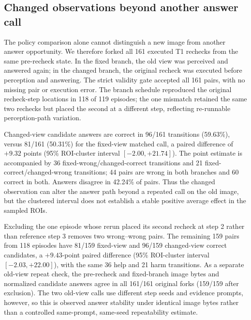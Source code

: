 \subsection{Changed observations beyond another answer call}
The policy comparison alone cannot distinguish a new image from another answer opportunity. We therefore forked all 161 executed T1 rechecks from the same pre-recheck state. In the fixed branch, the old view was perceived and answered again; in the changed branch, the original recheck was executed before perception and answering. The strict validity gate accepted all 161 pairs, with no missing pair or execution error. The branch schedule reproduced the original recheck-step locations in 118 of 119 episodes; the one mismatch retained the same two rechecks but placed the second at a different step, reflecting re-runnable perception-path variation.

Changed-view candidate answers are correct in 96/161 transitions (59.63\%), versus 81/161 (50.31\%) for the fixed-view matched call, a paired difference of $+9.32$ points (95\% ROI-cluster interval $[-2.00,+21.74]$). The point estimate is accompanied by 36 fixed-wrong/changed-correct transitions and 21 fixed-correct/changed-wrong transitions; 44 pairs are wrong in both branches and 60 correct in both. Answers disagree in 42.24\% of pairs. Thus the changed observation can alter the answer path beyond a repeated call on the old image, but the clustered interval does not establish a stable positive average effect in the sampled ROIs.

Excluding the one episode whose rerun placed its second recheck at step 2 rather than reference step 3 removes two wrong--wrong pairs. The remaining 159 pairs from 118 episodes have 81/159 fixed-view and 96/159 changed-view correct candidates, a $+9.43$-point paired difference (95\% ROI-cluster interval $[-2.03,+22.00]$), with the same 36 help and 21 harm transitions. As a separate old-view repeat check, the pre-recheck and fixed-branch image bytes and normalized candidate answers agree in all 161/161 original forks (159/159 after exclusion). The two old-view calls use different step seeds and evidence prompts, however, so this is observed answer stability under identical image bytes rather than a controlled same-prompt, same-seed repeatability estimate.

